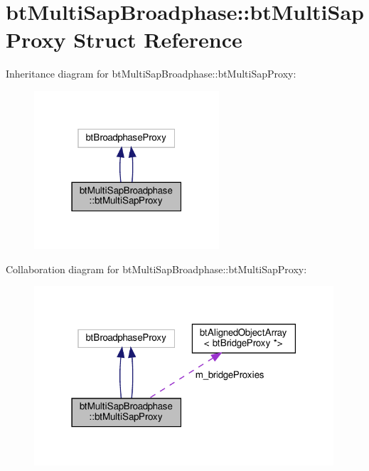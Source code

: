 \hypertarget{structbtMultiSapBroadphase_1_1btMultiSapProxy}{}\section{bt\+Multi\+Sap\+Broadphase\+:\+:bt\+Multi\+Sap\+Proxy Struct Reference}
\label{structbtMultiSapBroadphase_1_1btMultiSapProxy}


Inheritance diagram for bt\+Multi\+Sap\+Broadphase\+:\+:bt\+Multi\+Sap\+Proxy\+:
\nopagebreak
\begin{figure}[H]
\begin{center}
\leavevmode
\includegraphics[width=195pt]{structbtMultiSapBroadphase_1_1btMultiSapProxy__inherit__graph}
\end{center}
\end{figure}


Collaboration diagram for bt\+Multi\+Sap\+Broadphase\+:\+:bt\+Multi\+Sap\+Proxy\+:
\nopagebreak
\begin{figure}[H]
\begin{center}
\leavevmode
\includegraphics[width=316pt]{structbtMultiSapBroadphase_1_1btMultiSapProxy__coll__graph}
\end{center}
\end{figure}
